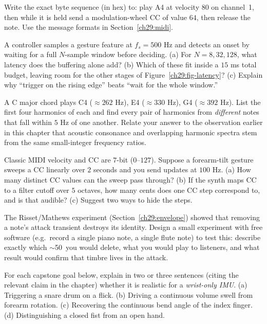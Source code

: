\begin{exercise}
Write the exact byte sequence (in hex) to: play A4 at velocity $80$ on channel~1, then while it is
held send a modulation-wheel CC of value $64$, then release the note. Use the message formats in
Section~\ref{ch29:midi}.
\end{exercise}

\begin{exercise}
A controller samples a gesture feature at $f_s = 500$ Hz and detects an onset by waiting for a full
$N$-sample window before deciding. (a) For $N = 8, 32, 128$, what latency does the buffering alone add?
(b) Which of these fit inside a $15$ ms total budget, leaving room for the other stages of
Figure~\ref{ch29:fig-latency}? (c) Explain why ``trigger on the rising edge'' beats ``wait for the
whole window.''
\end{exercise}

\begin{exercise}
A C major chord plays C4 ($\approx 262$ Hz), E4 ($\approx 330$ Hz), G4 ($\approx 392$ Hz). List the
first four harmonics of each and find every pair of harmonics from \emph{different} notes that fall
within $5$ Hz of one another. Relate your answer to the observation earlier in this chapter that acoustic consonance and overlapping harmonic spectra stem from the same small-integer frequency ratios.
\end{exercise}

\begin{exercise}
Classic MIDI velocity and CC are $7$-bit ($0$--$127$). Suppose a forearm-tilt gesture sweeps a CC
linearly over $2$ seconds and you send updates at $100$ Hz. (a) How many distinct CC values can the
sweep pass through? (b) If the synth maps CC to a filter cutoff over $5$ octaves, how many cents does
one CC step correspond to, and is that audible? (c) Suggest two ways to hide the steps.
\end{exercise}

\begin{exercise}
The Risset/Mathews experiment (Section~\ref{ch29:envelope}) showed that removing a note's attack
transient destroys its identity. Design a small experiment with free software (e.g.\ record a single
piano note, a single flute note) to test this: describe exactly which $\sim$50\, you would delete,
what you would play to listeners, and what result would confirm that timbre lives in the attack.
\end{exercise}

\begin{exercise}
For each capstone goal below, explain in two or three sentences (citing the relevant claim in the chapter) whether it is realistic for a \emph{wrist-only IMU}. (a) Triggering a snare drum
on a flick. (b) Driving a continuous volume swell from forearm rotation. (c) Recovering the continuous bend
angle of the index finger. (d) Distinguishing a closed fist from an open hand.
\end{exercise}

